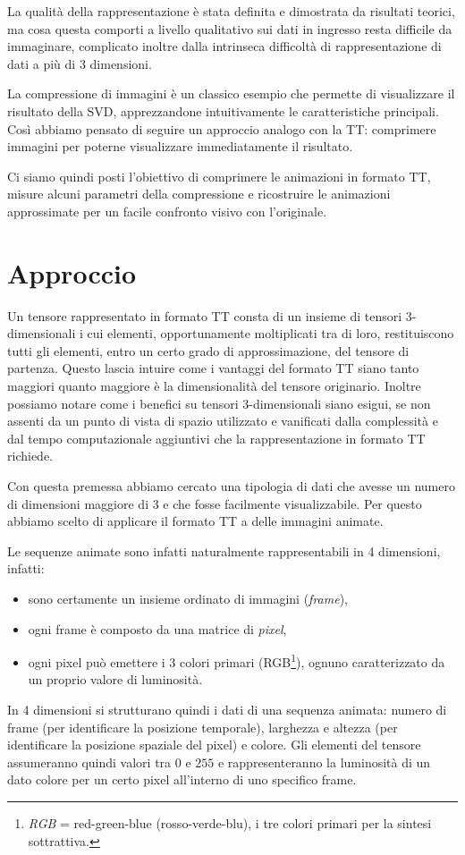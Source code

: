 \documentclass[11pt,a4paper]{article}
\begin{document}
  La qualità della rappresentazione è stata definita e dimostrata da risultati teorici, ma cosa questa comporti a livello qualitativo sui dati in ingresso resta difficile da immaginare, complicato inoltre dalla intrinseca difficoltà di rappresentazione di dati a più di 3 dimensioni.

  La compressione di immagini è un classico esempio che permette di visualizzare il risultato della SVD, apprezzandone intuitivamente le caratteristiche principali. Così abbiamo pensato di seguire un approccio analogo con la TT: comprimere immagini per poterne visualizzare immediatamente il risultato.

  Ci siamo quindi posti l'obiettivo di comprimere le animazioni in formato TT, misure alcuni parametri della compressione e ricostruire le animazioni approssimate per un facile confronto visivo con l'originale.

\section{Approccio}
Un tensore rappresentato in formato TT consta di un insieme di tensori 3-dimensionali i cui elementi, opportunamente moltiplicati tra di loro, restituiscono tutti gli elementi, entro un certo grado di approssimazione, del tensore di partenza.
Questo lascia intuire come i vantaggi del formato TT siano tanto maggiori quanto maggiore è la dimensionalità del tensore originario.
Inoltre possiamo notare come i benefici su tensori 3-dimensionali siano esigui, se non assenti da un punto di vista di spazio utilizzato e vanificati dalla complessità e dal tempo computazionale aggiuntivi che la rappresentazione in formato TT richiede.

Con questa premessa abbiamo cercato una tipologia di dati che avesse un numero di dimensioni maggiore di 3 e che fosse facilmente visualizzabile. Per questo abbiamo scelto di applicare il formato TT a delle immagini animate.

Le sequenze animate sono infatti naturalmente rappresentabili in 4 dimensioni, infatti:
\begin{itemize}
\item sono certamente un insieme ordinato di immagini (\emph{frame}),
\item ogni frame è composto da una matrice di \emph{pixel},
\item ogni pixel può emettere i 3 colori primari (RGB\footnote{\emph{RGB} = red-green-blue (rosso-verde-blu), i tre colori primari per la sintesi sottrattiva.}), ognuno caratterizzato da un proprio valore di luminosità.
\end{itemize}
In 4 dimensioni si strutturano quindi i dati di una sequenza animata: numero di frame (per identificare la posizione temporale), larghezza e altezza (per identificare la posizione spaziale del pixel) e colore. Gli elementi del tensore assumeranno quindi valori tra $0$ e $255$ e rappresenteranno la luminosità di un dato colore per un certo pixel all'interno di uno specifico frame.
\end{document}
